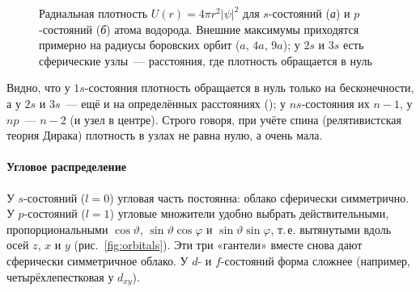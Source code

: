 \begin{figure}[ht]
\centering
\begin{subfigure}[b]{0.49\textwidth}\centering
{}
\caption{}
\end{subfigure}\hfill
\begin{subfigure}[b]{0.49\textwidth}\centering
{}
\caption{}
\end{subfigure}
\caption{Радиальная плотность $U(r)=4\pi r^2|\psi|^2$ для $s$-состояний
(\textit{а}) и $p$-состояний (\textit{б}) атома водорода. Внешние
максимумы приходятся примерно на радиусы боровских орбит ($a$, $4a$,
$9a$); у $2s$ и $3s$ есть сферические узлы~— расстояния, где плотность
обращается в нуль}
\label{fig:radial}
\end{figure}

Видно, что у $1s$-состояния плотность обращается в нуль только на
бесконечности, а у $2s$ и $3s$~— ещё и на определённых расстояниях
(); у $ns$-состояния их $n-1$, у $np$~— $n-2$
(и узел в центре). Строго говоря, при учёте спина (релятивистская теория
Дирака) плотность в узлах не равна нулю, а очень мала.

\paragraph{Угловое распределение}
У $s$-состояний ($l=0$) угловая часть постоянна: облако сферически
симметрично. У $p$-состояний ($l=1$) угловые множители удобно выбрать
действительными, пропорциональными $\cos\vartheta$,
$\sin\vartheta\cos\varphi$ и $\sin\vartheta\sin\varphi$, т.\,е.
вытянутыми вдоль осей $z$, $x$ и $y$ (рис.~\ref{fig:orbitals}). Эти три
«гантели» вместе снова дают сферически симметричное облако. У $d$- и
$f$-состояний форма сложнее (например, четырёхлепестковая у $d_{xy}$).

